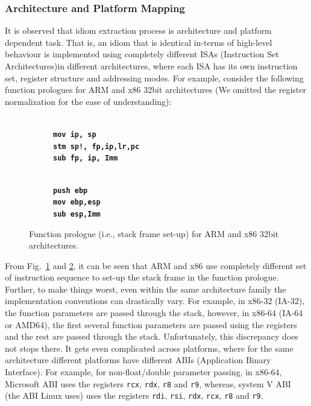 \subsubsection{Architecture and Platform Mapping} \label{subsubsec:archi_plat_dep}
It is observed that idiom extraction process is architecture and platform dependent task. That is, an idiom that is identical in-terms of high-level behaviour is implemented using completely different ISAs (Instruction Set Architectures)in different architectures, where each ISA has its own instruction set, register structure and addressing modes. For example, consider the following function prologues for ARM and x86 32bit architectures (We omitted the register normalization for the ease of understanding):

\begin{figure}[!th]
\scriptsize
  \begin{subfigure}[b]{0.5\linewidth}
   \centering
    \raggedright{\textbf{\texttt{
    \\
    	mov ip, sp\\
    	stm sp!, {fp,ip,lr,pc}\\
    	sub fp, ip, Imm\\
    }}}
    \caption{\small{}}
   \label{fig:idiom2-ex-a}
    \vspace{1ex}
  \end{subfigure}%
   \begin{subfigure}[b]{0.5\linewidth}
   \centering
    \raggedright{\textbf{\texttt{
    \\
    	push ebp\\
    	mov ebp,esp\\
    	sub esp,Imm\\
    }}}
    \caption{\small{}}
   \label{fig:idiom2-ex-b}
    \vspace{1ex}
  \end{subfigure}%
  \caption{Function prologue (i.e., stack frame set-up) for ARM and x86 32bit architectures.}
  \label{fig:idiom2-ex}
\end{figure}
From Fig.~\ref{fig:idiom2-ex-a} and \ref{fig:idiom2-ex-b}, it can be seen that ARM and x86 use completely different set of instruction sequence to set-up the stack frame in the function prologue. Further, to make things worst, even within the same architecture family the implementation conventions can drastically vary. For example, in x86-32 (IA-32), the function parameters are passed through the stack, however, in x86-64 (IA-64 or AMD64), the first several function parameters are passed using the registers and the rest are passed through the stack. Unfortunately, this discrepancy does not stops there. It gets even complicated across platforms, where for the same architecture different platforms have different ABIs (Application Binary Interface). For example, for non-float/double parameter passing, in x86-64, Microsoft ABI uses the registers \texttt{rcx}, \texttt{rdx}, \texttt{r8} and \texttt{r9}, whereas, system V ABI (the ABI Linux uses) uses the registers \texttt{rdi}, \texttt{rsi}, \texttt{rdx}, \texttt{rcx}, \texttt{r8} and \texttt{r9}.

